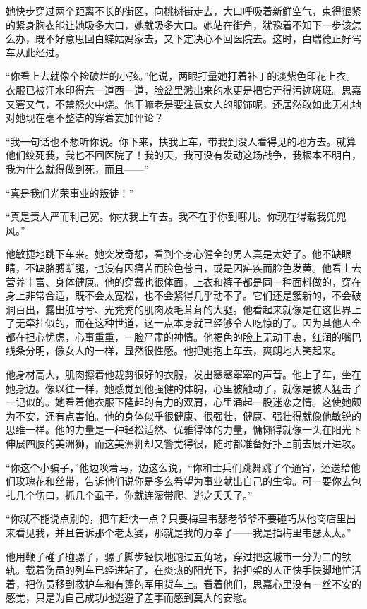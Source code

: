 \par 她快步穿过两个距离不长的街区，向桃树街走去，大口呼吸着新鲜空气，束得很紧的紧身胸衣能让她吸多大口，她就吸多大口。她站在街角，犹豫着不知下一步该怎么办，既不好意思回白蝶姑妈家去，又下定决心不回医院去。这时，白瑞德正好驾车从此经过。
\par “你看上去就像个捡破烂的小孩。”他说，两眼打量她打着补丁的淡紫色印花上衣。衣服已被汗水印得东一道西一道，脸盆里溅出来的水更是把它弄得污迹斑斑。思嘉又窘又气，不禁怒火中烧。他干嘛老是要注意女人的服饰呢，还居然敢如此无礼地对她现在毫不整洁的穿着妄加评论？
\par “我一句话也不想听你说。你下来，扶我上车，带我到没人看得见的地方去。就算他们绞死我，我也不回医院了！我的天，我可没有发动这场战争，我根本不明白，我为什么就得做到死，而且——”
\par “真是我们光荣事业的叛徒！”
\par “真是责人严而利己宽。你扶我上车去。我不在乎你到哪儿。你现在得载我兜兜风。”
\par 他敏捷地跳下车来。她突发奇想，看到个身心健全的男人真是太好了。他不缺眼睛，不缺胳膊断腿，也没有因痛苦而脸色苍白，或是因疟疾而脸色发黄。他看上去营养丰富、身体健康。他的穿戴也很体面，上衣和裤子都是同一种面料做的，穿在身上非常合适，既不会太宽松，也不会紧得几乎动不了。它们还是簇新的，不会破洞百出，露出脏兮兮、光秃秃的肌肉及毛茸茸的大腿。他看起来就像是在这世界上了无牵挂似的，而在这种世道，这一点本身就已经够令人吃惊的了。因为其他人全都在担心忧虑，心事重重，一脸严肃的神情。他褐色的脸上无动于衷，红润的嘴巴线条分明，像女人的一样，显然很性感。他把她抱上车去，爽朗地大笑起来。
\par 他身材高大，肌肉擦着他裁剪很好的衣服，发出窸窸窣窣的声音。他上了车，坐在她身边。像以往一样，她感觉到他强健的体魄，心里被触动了，就像是被人猛击了一记似的。她看着他衣服下隆起的有力的双肩，心里涌起一股迷恋之情。这使她颇为不安，还有点害怕。他的身体似乎很健康、很强壮，健康、强壮得就像他敏锐的思维一样。他的力量是一种轻松适然、优雅得体的力量，慵懒得就像一头在阳光下伸展四肢的美洲狮，而这美洲狮却又警觉得很，随时都准备好扑上前去展开进攻。
\par “你这个小骗子，”他边唤着马，边这么说，“你和士兵们跳舞跳了个通宵，还送给他们玫瑰花和丝带，告诉他们说你是多么希望为事业献出自己的生命。可一要你去包扎几个伤口，抓几个虱子，你就连滚带爬、逃之夭夭了。”
\par “你就不能说点别的，把车赶快一点？只要梅里韦瑟老爷爷不要碰巧从他商店里出来看见我，并且告诉那个老太婆，那就是我的万幸了——我是指梅里韦瑟太太。”
\par 他用鞭子碰了碰骡子，骡子脚步轻快地跑过五角场，穿过把这城市一分为二的铁轨。载着伤员的列车已经进站了，在炎热的阳光下，抬担架的人正快手快脚地忙活着，把伤员移到救护车和有篷的军用货车上。看着他们，思嘉心里没有一丝不安的感觉，只是为自己成功地逃避了差事而感到莫大的安慰。
